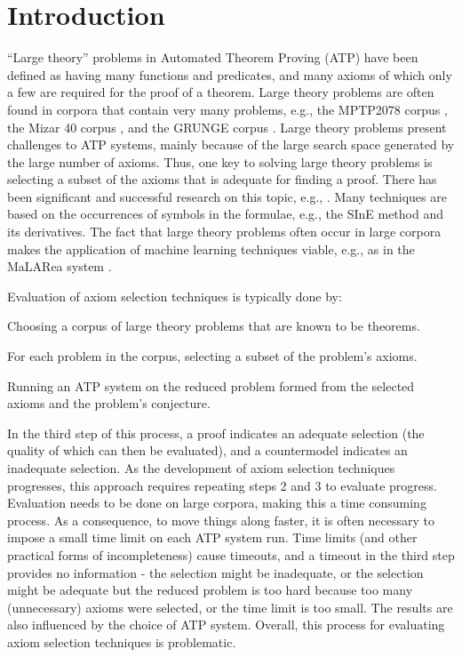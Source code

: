 \documentclass[]{ceurart}
\newenvironment{packed_enumerate}{
\vspace*{-0.5em}
\begin{enumerate}
  \setlength{\partopsep}{0pt}
  \setlength{\itemsep}{1pt}
  \setlength{\parskip}{0pt}
  \setlength{\parsep}{0pt}
}{\end{enumerate}}
\begin{document}
\section{Introduction}
\label{Introduction}

``Large theory'' problems in Automated Theorem Proving (ATP) have been 
defined \cite{Sut20-CASC} as having many functions and predicates, and 
many axioms of which only a few are required for the proof of a theorem.
Large theory problems are often found in corpora that contain very many
problems, e.g., the MPTP2078 corpus \cite{AH+14}, the Mizar 40 corpus
\cite{KU15-M40}, and the GRUNGE corpus \cite{BG+19}.
Large theory problems present challenges to ATP systems, mainly because of the
large search space generated by the large number of axioms.
Thus, one key to solving large theory problems is selecting a subset of the 
axioms that is adequate for finding a proof. 
There has been significant and successful research on this topic, e.g.,
\cite{PSZG04,SP07,MP09,KC+10,HV11,Kv+12,AH+14,GK15,PU18}.
Many techniques are based on the occurrences of symbols in the formulae,
e.g., the SInE method \cite{HV11} and its derivatives. 
The fact that large theory problems often occur in large corpora makes the
application of machine learning techniques \cite{KB14} viable, e.g., as 
in the MaLARea system \cite{US+08}.

Evaluation of axiom selection techniques is typically done by:
\begin{packed_enumerate}
\item Choosing a corpus of large theory problems that are known to be theorems.
\item For each problem in the corpus, selecting a subset of the problem's
      axioms.
\item Running an ATP system on the reduced problem formed from the selected 
      axioms and the problem's conjecture.
\end{packed_enumerate}
In the third step of this process, a proof indicates an adequate selection
(the quality of which can then be evaluated), and a countermodel indicates 
an inadequate selection. 
As the development of axiom selection techniques progresses, this approach 
requires repeating steps 2 and 3 to evaluate progress.
Evaluation needs to be done on large corpora, making this a time consuming 
process.
As a consequence, to move things along faster, it is often necessary to impose 
a small time limit on each ATP system run.
Time limits (and other practical forms of incompleteness) cause timeouts, and 
a timeout in the third step provides no information - the selection might be 
inadequate, or the selection might be adequate but the reduced problem is 
too hard because too many (unnecessary) axioms were selected, or the time 
limit is too small.
The results are also influenced by the choice of ATP system.
Overall, this process for evaluating axiom selection techniques is problematic.
\end{document}
